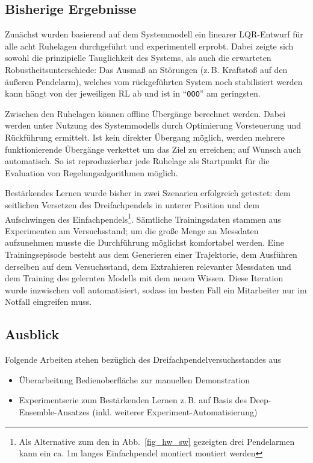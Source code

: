 \documentclass[a4paper,10pt]{scrartcl}
\newcommand{\figref}[1]{Abb.~\ref{#1}}
\begin{document}
\subsection{Bisherige Ergebnisse}

Zunächst wurden basierend auf dem Systemmodell ein linearer LQR-Entwurf für alle acht Ruhelagen durchgeführt und experimentell erprobt. Dabei zeigte sich sowohl die prinzipielle Tauglichkeit des Systems, als auch die erwarteten Robustheitsunterschiede: Das Ausmaß an Störungen (z.\,B. Kraftstoß auf den äußeren Pendelarm), welches vom rückgeführten System noch stabilisiert werden kann hängt von der jeweiligen RL ab und ist in "`\texttt{OOO}"' am geringsten.
    
\medskip
    
Zwischen den Ruhelagen können offline Übergänge berechnet werden. Dabei werden unter Nutzung des Systemmodells durch Optimierung Vorsteuerung und Rückführung ermittelt. Ist kein direkter Übergang möglich, werden mehrere funktionierende Übergänge verkettet um das Ziel zu erreichen; auf Wunsch auch automatisch. So ist reproduzierbar jede Ruhelage als Startpunkt für die Evaluation von Regelungsalgorithmen möglich.

\medskip
Bestärkendes Lernen wurde bisher in zwei Szenarien erfolgreich getestet: dem seitlichen Versetzen des Dreifachpendels in unterer Position und dem Aufschwingen des Einfachpendels\footnote{Als Alternative zum den in \figref{fig_hw_sw} gezeigten drei Pendelarmen kann ein ca. 1m langes Einfachpendel montiert montiert werden}. Sämtliche Trainingsdaten stammen aus Experimenten am Versuchsstand; um die große Menge an Messdaten aufzunehmen musste die Durchführung möglichst komfortabel werden. Eine Trainingsepisode besteht aus dem Generieren einer Trajektorie, dem Ausführen derselben auf dem Versuchsstand, dem Extrahieren relevanter Messdaten und dem Training des gelernten Modells mit dem neuen Wissen. Diese Iteration wurde inzwischen voll automatisiert, sodass im besten Fall ein Mitarbeiter nur im Notfall eingreifen muss.
    

\subsection{Ausblick}

Folgende Arbeiten stehen bezüglich des Dreifachpendelversuchsstandes aus

\begin{itemize}
 \item Überarbeitung Bedienoberfläche zur manuellen Demonstration
 \item Experimentserie zum Bestärkenden Lernen z.\,B. auf Basis des Deep-Ensemble-Ansatzes
 (inkl. weiterer Experiment-Automatisierung)
\end{itemize}
\end{document}
